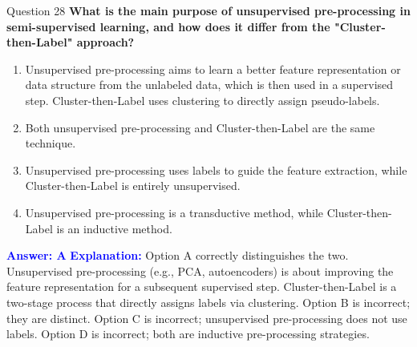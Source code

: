 \documentclass[8pt]{beamer}  %
\begin{document}
	\begin{frame}{Question 28}
		\textbf{What is the main purpose of unsupervised pre-processing in semi-supervised learning, and how does it differ from the "Cluster-then-Label" approach?}
		\begin{enumerate}
			\item Unsupervised pre-processing aims to learn a better feature representation or data structure from the unlabeled data, which is then used in a supervised step. Cluster-then-Label uses clustering to directly assign pseudo-labels.
			\item Both unsupervised pre-processing and Cluster-then-Label are the same technique.
			\item Unsupervised pre-processing uses labels to guide the feature extraction, while Cluster-then-Label is entirely unsupervised.
			\item Unsupervised pre-processing is a transductive method, while Cluster-then-Label is an inductive method.
		\end{enumerate}
		\vspace{0.2cm}
		\textcolor{blue}{\textbf{Answer: A}}
		\vspace{0.2cm}
		\textcolor{blue}{\textbf{Explanation:}} Option A correctly distinguishes the two. Unsupervised pre-processing (e.g., PCA, autoencoders) is about improving the feature representation for a subsequent supervised step. Cluster-then-Label is a two-stage process that directly assigns labels via clustering. Option B is incorrect; they are distinct. Option C is incorrect; unsupervised pre-processing does not use labels. Option D is incorrect; both are inductive pre-processing strategies.
	\end{frame}
	
\end{document}
